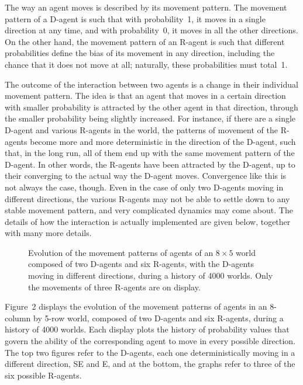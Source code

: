 \documentclass[11pt, a4paper]{article}
\begin{document}
The way an agent moves is described by its movement pattern. The movement pattern of a D-agent is such that with probability~1, it moves in a single direction at any time, and with probability~0, it moves in all the other directions. On the other hand, the movement pattern of an R-agent is such that different probabilities define the bias of its movement in any direction, including the chance that it does not move at all; naturally, these probabilities must total~1.

The outcome of the interaction between two agents is a change in their individual movement pattern. The idea is that an agent that moves in a certain direction with smaller probability is attracted by the other agent in that direction, through the smaller probability being slightly increased. For instance, if there are a single D-agent and various R-agents in the world, the patterns of movement of the R-agents become more and more deterministic in the direction of the D-agent, such that, in the long run, all of them end up with the same movement pattern of the D-agent. In other words, the R-agents have been attracted by the D-agent, up to their converging to the actual way the D-agent moves. Convergence like this is not always the case, though. Even in the case of only two D-agents moving in different directions, the various R-agents may not be able to settle down to any stable movement pattern, and very complicated dynamics may come about. The details of how the interaction is actually implemented are given below, together with many more details.

\begin{figure}[htbp]
\centering
{}
\caption{Evolution of the movement patterns of agents of an $8\times5$ world composed of two D-agents and six R-agents, with the D-agents moving in different directions, during a history of 4000 worlds. Only the movements of three R-agents are on display.}
\end{figure}

Figure~2 displays the evolution of the movement patterns of agents in an 8-column by 5-row world, composed of two D-agents and six R-agents, during a history of 4000 worlds. Each display plots the history of probability values that govern the ability of the corresponding agent to move in every possible direction. The top two figures refer to the D-agents, each one deterministically moving in a different direction, SE and E, and at the bottom, the graphs refer to three of the six possible R-agents.
\end{document}

